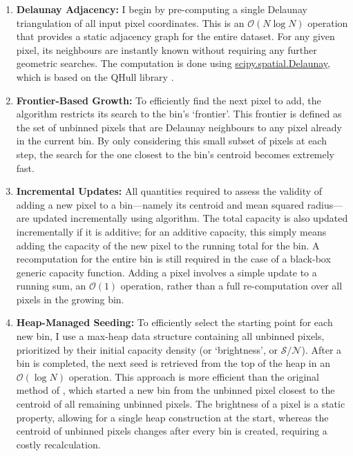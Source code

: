 \documentclass[fleqn,usenatbib]{mnras}
\newcommand{\sn}{\mathcal{S/N}}
\begin{document}
\begin{enumerate}
    \item \textbf{Delaunay Adjacency:} I begin by pre-computing a single Delaunay triangulation of all input pixel coordinates. This is an $\mathcal{O}(N\log N)$ operation that provides a static adjacency graph for the entire dataset. For any given pixel, its neighbours are instantly known without requiring any further geometric searches. The computation is done using \href{https://docs.scipy.org/doc/scipy/reference/generated/scipy.spatial.Delaunay.html}{scipy.spatial.Delaunay}, which is based on the QHull library \citep{Barber1996}.

    \item \textbf{Frontier-Based Growth:} To efficiently find the next pixel to add, the algorithm restricts its search to the bin's `frontier'. This frontier is defined as the set of unbinned pixels that are Delaunay neighbours to any pixel already in the current bin. By only considering this small subset of pixels at each step, the search for the one closest to the bin's centroid becomes extremely fast.

    \item \textbf{Incremental Updates:} All quantities required to assess the validity of adding a new pixel to a bin---namely its centroid and mean squared radius---are updated incrementally using \citet{Welford1962} algorithm. The total capacity is also updated incrementally if it is additive; for an additive capacity, this simply means adding the capacity of the new pixel to the running total for the bin. A recomputation for the entire bin is still required in the case of a black-box generic capacity function. Adding a pixel involves a simple update to a running sum, an $\mathcal{O}(1)$ operation, rather than a full re-computation over all pixels in the growing bin.

    \item \textbf{Heap-Managed Seeding:} To efficiently select the starting point for each new bin, I use a max-heap data structure containing all unbinned pixels, prioritized by their initial capacity density (or `brightness', or $\sn$). After a bin is completed, the next seed is retrieved from the top of the heap in an $\mathcal{O}(\log N)$ operation. This approach is more efficient than the original method of \citet{Cappellari2003}, which started a new bin from the unbinned pixel closest to the centroid of all remaining unbinned pixels. The brightness of a pixel is a static property, allowing for a single heap construction at the start, whereas the centroid of unbinned pixels changes after every bin is created, requiring a costly recalculation.
\end{enumerate} 
\end{document}
